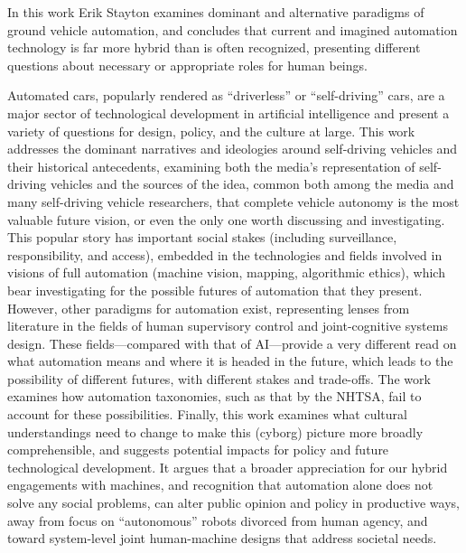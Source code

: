 % 
% 
%


In this work Erik Stayton examines dominant and alternative paradigms of ground
vehicle automation, and concludes that current and imagined automation
technology is far more hybrid than 
is often recognized, presenting different questions about necessary or
appropriate roles for human beings.

Automated cars, popularly rendered as ``driverless'' or
``self-driving'' cars, are a major sector of technological
development in artificial intelligence and present a variety of
questions for design, policy, and the culture at large. This work addresses the
dominant narratives and ideologies around self-driving 
vehicles and their historical antecedents, examining both the media's representation
of self-driving vehicles and 
the sources of the idea, common both among the media and many
self-driving vehicle researchers, that complete vehicle autonomy is
the most valuable future vision, or even the only one  worth
discussing and investigating. 
This popular story has important social stakes (including
surveillance, responsibility, and access), embedded in the
technologies and fields involved in visions of full
automation (machine vision, mapping, algorithmic ethics), which bear investigating
for the possible futures of 
automation that they present.
However, other paradigms for automation exist,
representing lenses from
literature in the fields of human supervisory control and
joint-cognitive systems design. These fields---compared with
that of AI---provide a very
different read on what automation means and where it is headed in the
future, which leads to the possibility of different futures, with
different stakes and trade-offs. The work examines how automation
taxonomies, such as that by the NHTSA, fail to account for these
possibilities. Finally, this work examines what cultural 
understandings need to change to 
make this (cyborg) picture more broadly comprehensible, and suggests potential
impacts for policy and future technological development. It argues that
a broader appreciation for 
our hybrid engagements with machines, and recognition that automation
alone does not solve any social problems, can alter public
opinion and policy in productive ways, away from focus on
``autonomous'' robots divorced from human agency, and toward
system-level joint human-machine designs that address societal needs. 
